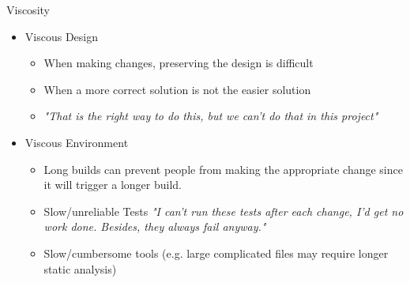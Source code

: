 \documentclass[xcolor=svgnames]{beamer}
\begin{document}




{%
%
\begin{frame}{Viscosity}

    \begin{itemize}
        \item<1->Viscous Design
        \begin{itemize}
            \item<3->When making changes, preserving the design is difficult
            \item<4->When a more correct solution is not the easier solution
            \item<5->\textit{"That is the right way to do this, but we can't do
                that in this project"}
        \end{itemize}
        \item<2->Viscous Environment
        \begin{itemize}
            \item<6->Long builds can prevent people from making the appropriate
                change since it will trigger a longer build.
            \item<7->Slow/unreliable Tests \textit{"I can't run these tests
                after each change, I'd get no work done.  Besides, they always
                fail anyway."}
            \item<8->Slow/cumbersome tools (e.g. large complicated files may
                require longer static analysis)
        \end{itemize}
    \end{itemize}
\end{frame}
}
\end{document}
